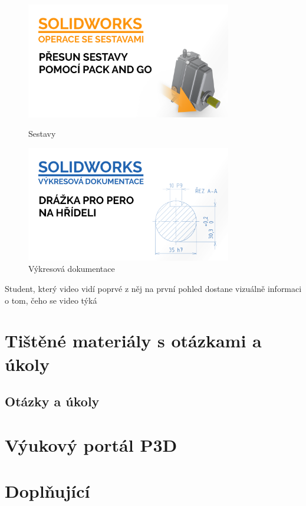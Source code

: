 \begin{figure}[htbp]
    \centering
    \begin{minipage}[b]{0.45\textwidth}
        \centering
        \includegraphics[width=0.8\textwidth]{img/020/pack-and-go-thumbnail.png}
        \caption{Sestavy}
        \label{fig:thumb3}
    \end{minipage}
    \qquad
    \begin{minipage}[b]{0.45\textwidth}
        \centering
        \includegraphics[width=0.8\textwidth]{img/020/dwg-perodr-hr-thumbnail.png}
        \caption{Výkresová dokumentace}
        \label{fig:thumb4}
    \end{minipage}
\end{figure}



Student, který video vidí poprvé z něj na první pohled dostane vizuálně informaci o tom, čeho se video týká

\section{Tištěné materiály s otázkami a úkoly}


\subsection{Otázky a úkoly}


\section{Výukový portál P3D}


\section{Doplňující }

